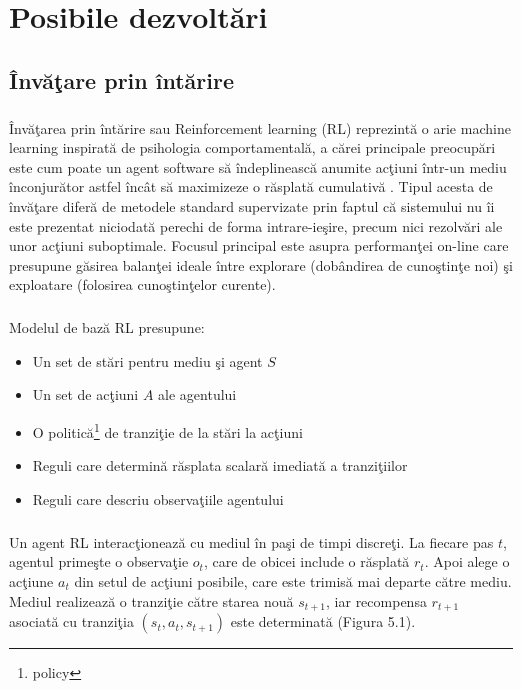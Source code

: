 \chapter{Posibile dezvolt\u ari}

\section{\^ Inv\u a\c tare prin \^ int\u arire}

\paragraph{}
\^ Inv\u a\c tarea prin \^ int\u arire sau Reinforcement learning (RL) reprezint\u a o arie machine learning inspirat\u a de psihologia comportamental\u a, a c\u arei principale preocup\u ari este cum poate un agent software s\u a \^ indeplineasc\u a anumite ac\c tiuni \^ intr-un mediu \^ inconjur\u ator astfel \^ inc\^ at s\u a maximizeze o r\u asplat\u a cumulativ\u a \cite{Sutton:1998:IRL:551283}. Tipul acesta de \^ inv\u a\c tare difer\u a de metodele standard supervizate prin faptul c\u a sistemului nu \^ ii este prezentat niciodat\u a perechi de forma intrare-ie\c sire, precum nici rezolv\u ari ale unor ac\c tiuni suboptimale. Focusul principal este asupra performan\c tei on-line care presupune g\u asirea balan\c tei ideale \^ intre explorare (dob\^ andirea de cuno\c stin\c te noi) \c si exploatare (folosirea cuno\c stin\c telor curente). 

\paragraph{}
Modelul de baz\u a RL presupune:

\begin{itemize}
	\item Un set de st\u ari pentru mediu \c si agent \(S\)
	\item Un set de ac\c tiuni \(A\) ale agentului
	\item O politic\u a\footnote{policy} de tranzi\c tie de la st\u ari la ac\c tiuni
	\item Reguli care determin\u a r\u asplata scalar\u a imediat\u a a tranzi\c tiilor
	\item Reguli care descriu observa\c tiile agentului
\end{itemize}

\paragraph{}
Un agent RL interac\c tioneaz\u a cu mediul \^ in pa\c si de timpi discre\c ti. La fiecare pas \(t\), agentul prime\c ste o observa\c tie \(o_t\), care de obicei include o r\u asplat\u a \(r_t\). Apoi alege o ac\c tiune \(a_t\) din setul de ac\c tiuni posibile, care este trimis\u a mai departe c\u atre mediu. Mediul realizeaz\u a o tranzi\c tie c\u atre starea nou\u a \(s_{t+1}\), iar recompensa \(r_{t+1}\) asociat\u a cu tranzi\c tia \((s_t, a_t, s_{t+1})\) este determinat\u a (Figura 5.1).

